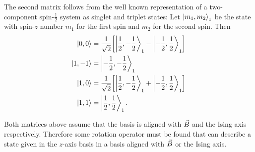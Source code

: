 \documentclass[a4paper]{article}
\begin{document}
The second matrix follows from the well known representation of a two-component
spin-\(\frac{1}{2}\) system as singlet and triplet states: Let \(\ket{m_1, m_2}_1\) be the
state with spin-\(z\) number \(m_1\) for the first spin and \(m_2\) for the second
spin. Then
\begin{align*}
    \ket{0, 0} &= \frac{1}{\sqrt{2}}\bqty{\ket{\frac{1}{2}, -\frac{1}{2}}_1 -
                \ket{-\frac{1}{2}, \frac{1}{2}}_1}\\
    \ket{1, -1} &= \ket{-\frac{1}{2}, -\frac{1}{2}}_1\\
    \ket{1, 0} &= \frac{1}{\sqrt{2} }\bqty{\ket{\frac{1}{2}, -\frac{1}{2}}_1 +
            \ket{-\frac{1}{2}, \frac{1}{2}}_1}\\
    \ket{1, 1} &= \ket{\frac{1}{2}, \frac{1}{2}}_1
.\end{align*}

Both matrices above assume that the basis is aligned with \(\vec{B}\) and the Ising axis
respectively. Therefore some rotation operator must be found that can describe a state
given in the \(z\)-axis basis in a basis aligned with \(\vec{B}\) or the Ising axis.
\end{document}
